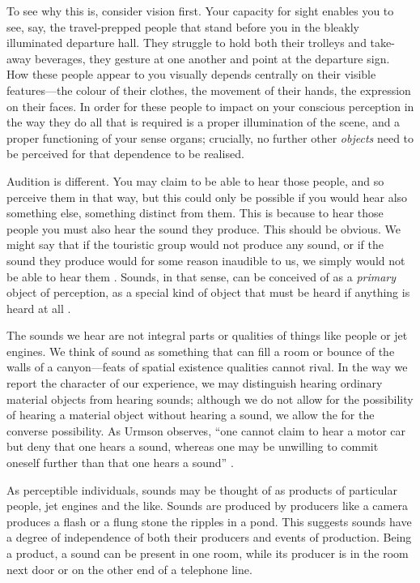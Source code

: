 \documentclass[sloppy, journal, git, bytitle, dodraft]{humapap}
\begin{document}
To see why this is, consider vision first. Your capacity for sight enables you to see, say, the travel-prepped people that stand before you in the bleakly illuminated departure hall. They struggle to hold both their trolleys and take-away beverages, they gesture at one another and point at the departure sign. How these people appear to you visually depends centrally on their visible features---the colour of their clothes, the movement of their hands, the expression on their faces. In order for these people to impact on your conscious perception in the way they do all that is required is a proper illumination of the scene, and a proper functioning of your sense organs; crucially, no further other \emph{objects} need to be perceived for that dependence to be realised.

Audition is different. You may claim to be able to hear those people, and so perceive them in that way, but this could only be possible if you would hear also something else, something distinct from them. This is because to hear those people you must also hear the sound they produce. This should be obvious. We might say that if the touristic group would not produce any sound, or if the sound they produce would for some reason inaudible to us, we simply would not be able to hear them . Sounds, in that sense, can be conceived of as a \emph{primary} object of perception, as a special kind of object that must be  heard if anything is heard at all \autocite[p. 118]{urmson1968aa}. 

The sounds we hear are not integral parts or qualities of things like people or jet engines. We think of sound as something that can fill a room or bounce of the walls of a canyon---feats of spatial existence qualities cannot rival. In the way we report the character of our experience, we may distinguish hearing ordinary material objects from hearing sounds; although we do not allow for the possibility of hearing a material object without hearing a sound, we allow the for the converse possibility. As Urmson observes, ``one cannot claim to hear a motor car but deny that one hears a sound, whereas one may be unwilling to commit oneself further than that one hears a sound'' \autocite[p. 118]{urmson1968aa}.

As perceptible individuals, sounds may be thought of as products of particular people, jet engines and the like. Sounds are produced by producers like a camera produces a flash or a flung stone the ripples in a pond. This suggests sounds have a degree of independence of both their producers and events of production. Being a product, a sound can be present in one room, while its producer is in the room next door or on the other end of a telephone line. 
\end{document}
